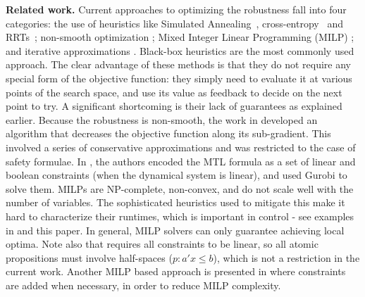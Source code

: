 \noindent \textbf{Related work.}
Current approaches to optimizing the robustness fall into four categories: 
the use of heuristics like Simulated Annealing~\cite{NghiemSFIGP10hscc}, cross-entropy~\cite{SankaranarayananF2012hscc} and RRTs~\cite{Dreossi15_RRTFalsification}; %
non-smooth optimization \cite{AbbasF13acc};  
Mixed Integer Linear Programming (MILP) \cite{Raman14_MPCSTL,Saha_acc16}; 
and iterative approximations \cite{AbbasATVA11_LinFalsification,Abbas14_MTLDescent,Deshmukh15_IterativeApproaches}.
Black-box heuristics are the most commonly used approach.
The clear advantage of these methods is that they do not require any special form of the objective function: they simply need to evaluate it at various points of the search space, and use its value as feedback to decide on the next point to try.
A significant shortcoming is their lack of guarantees as explained earlier.
Because the robustness is non-smooth, the work in \cite{AbbasF13acc} developed an algorithm that decreases the objective function along its sub-gradient. 
This involved a series of conservative approximations and was restricted to the case of safety formulae.
In \cite{Raman14_MPCSTL}, the authors encoded the MTL formula as a set of linear and boolean constraints (when the dynamical system is linear), and used Gurobi to solve them.
MILPs are NP-complete, non-convex, and do not scale well with the number of variables. 
The sophisticated heuristics used to mitigate this make it hard to characterize their runtimes, which is important in control - see examples in \cite{Raman14_MPCSTL} and this paper. 
In general, MILP solvers can only guarantee achieving local optima.
Note also that \cite{Raman14_MPCSTL} requires all constraints to be linear, so all atomic propositions must involve half-spaces ($p: a'x\leq b$), which is not a restriction in the current work. Another MILP based approach is presented in \cite{Saha_acc16} where constraints are added when necessary, in order to reduce MILP complexity.
